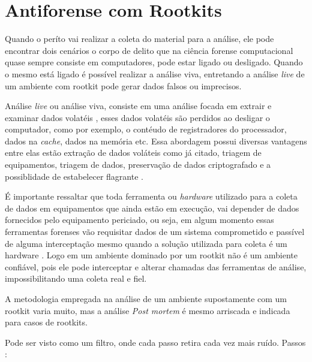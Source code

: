 \chapter{Antiforense com Rootkits}

Quando o períto vai realizar a coleta do material para a análise, ele pode encontrar dois cenários o corpo de delito que na ciência forense computacional quase sempre consiste em computadores,  pode estar ligado ou desligado. Quando o mesmo está ligado é possível realizar a análise viva, entretando a análise \emph{live} de um ambiente com rootkit pode gerar dados falsos ou imprecisos.

Análise \emph{live} ou análise viva, consiste em uma análise focada em extrair e examinar dados volatéis \cite{MCDOUGAL2006}, esses dados volatéis são perdidos ao desligar o computador, como por exemplo, o contéudo de registradores do processador, dados na \emph{cache}, dados na memória etc. Essa abordagem possui diversas vantagens entre elas estão extração de dados voláteis como já citado, triagem de equipamentos, triagem de dados, preservação de dados criptografado e a possiblidade de estabelecer flagrante \cite{FBC2011}.

É importante ressaltar que toda ferramenta ou \emph{hardware} utilizado para a coleta de dados em equipamentos que ainda estão em execução, vai depender de dados fornecidos pelo equipamento periciado, ou seja, em algum momento essas ferramentas forenses vão requisitar dados de um sistema comprometido e passível de alguma interceptação mesmo quando a solução utilizada para coleta é um hardware \cite{JORUT2007}. Logo em um ambiente dominado por um rootkit não é um ambiente confiável, pois ele pode interceptar e alterar chamadas das ferramentas de análise, impossibilitando uma coleta real e fiel.







A metodologia empregada na análise de um ambiente supostamente com um rootkit varia muito, mas a análise \emph{Post mortem} é mesmo arriscada e indicada para casos de rootkits.

Pode ser visto como um filtro, onde cada passo retira cada vez mais ruído. Passos \cite{BH2009}:


